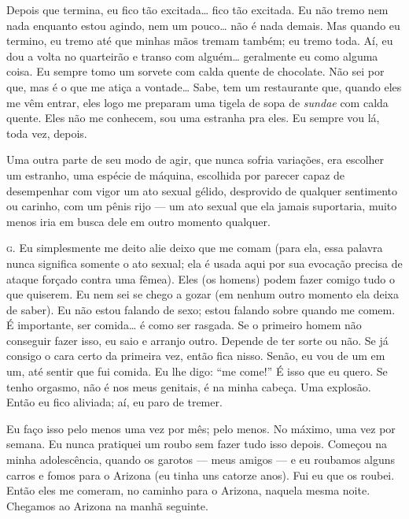 Depois que termina, eu fico tão excitada\ldots{} fico tão excitada. Eu
não tremo nem nada enquanto estou agindo, nem um pouco\ldots{} não é nada
demais. Mas quando eu termino, eu tremo até que minhas mãos tremam
também; eu tremo toda. Aí, eu dou a volta no quarteirão e transo com
alguém\ldots{} geralmente eu como alguma coisa. Eu sempre tomo um sorvete
com calda quente de chocolate. Não sei por que, mas é o que me atiça a
vontade\ldots{} Sabe, tem um restaurante que, quando eles me vêm entrar,
eles logo me preparam uma tigela de sopa de \textit{sundae} com calda
quente. Eles não me conhecem, sou uma estranha pra eles. Eu sempre vou
lá, toda vez, depois.

\bigskip

Uma outra parte de seu modo de agir, que nunca sofria variações, era
escolher um estranho, uma espécie de máquina, escolhida por parecer
capaz de desempenhar com vigor um ato sexual gélido, desprovido de
qualquer sentimento ou carinho, com um pênis rijo --- um ato sexual
que ela jamais suportaria, muito menos iria em busca dele em outro
momento qualquer.

\bigskip

\noindent\hskip0mm\textsc{g.} Eu simplesmente me deito ali\idxestup[|(] e deixo que me comam (para ela, essa
palavra nunca significa somente o ato sexual; ela é usada aqui por sua
evocação precisa de ataque forçado contra uma fêmea). Eles (os homens)
podem fazer comigo tudo o que quiserem. Eu nem sei se chego a gozar (em
nenhum outro momento ela deixa de saber). Eu não estou falando de sexo;
estou falando sobre quando me comem. É importante, ser comida\ldots{} é como
ser rasgada. Se o primeiro homem não conseguir fazer isso, eu saio e
arranjo outro. Depende de ter sorte ou não. Se já consigo o cara certo
da primeira vez, então fica nisso. Senão, eu vou de um em um, até
sentir que fui comida. Eu lhe digo: ``me
come!'' É isso que eu quero. Se tenho orgasmo, não é nos
meus genitais, é na minha cabeça. Uma explosão. Então eu fico aliviada;
aí, eu paro de tremer.

Eu faço isso pelo menos uma vez por mês; pelo menos. No máximo,
uma vez por semana. Eu nunca pratiquei um roubo sem fazer tudo isso
depois. Começou na minha adolescência, quando os garotos --- meus
amigos --- e eu roubamos alguns carros e fomos para o Arizona (eu
tinha uns catorze anos). Fui eu que os roubei. Então eles me comeram,
no caminho para o Arizona, naquela mesma noite. Chegamos ao Arizona na
manhã seguinte.

\bigskip


